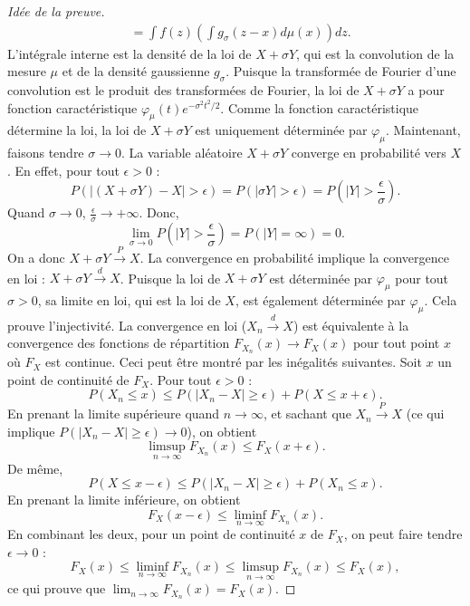 \begin{proof}[Idée de la preuve]
\begin{align*}
&= \int f(z) \left( \int g_\sigma(z-x) d\mu(x) \right) dz.
\end{align*}
L'intégrale interne est la densité de la loi de $X+\sigma Y$, qui est la convolution de la mesure $\mu$ et de la densité gaussienne $g_\sigma$. Puisque la transformée de Fourier d'une convolution est le produit des transformées de Fourier, la loi de $X+\sigma Y$ a pour fonction caractéristique $\varphi_\mu(t) e^{-\sigma^2 t^2/2}$.
Comme la fonction caractéristique détermine la loi, la loi de $X+\sigma Y$ est uniquement déterminée par $\varphi_\mu$.
Maintenant, faisons tendre $\sigma \to 0$. La variable aléatoire $X+\sigma Y$ converge en probabilité vers $X$.
En effet, pour tout $\epsilon > 0$ :
\[ P(|(X+\sigma Y) - X| > \epsilon) = P(|\sigma Y| > \epsilon) = P\left(|Y| > \frac{\epsilon}{\sigma}\right). \]
Quand $\sigma \to 0$, $\frac{\epsilon}{\sigma} \to +\infty$. Donc,
\[ \lim_{\sigma \to 0} P\left(|Y| > \frac{\epsilon}{\sigma}\right) = P(|Y| = \infty) = 0. \]
On a donc $X+\sigma Y \xrightarrow{P} X$.
La convergence en probabilité implique la convergence en loi : $X+\sigma Y \xrightarrow{d} X$.
Puisque la loi de $X+\sigma Y$ est déterminée par $\varphi_\mu$ pour tout $\sigma>0$, sa limite en loi, qui est la loi de $X$, est également déterminée par $\varphi_\mu$. Cela prouve l'injectivité.
La convergence en loi ($X_n \xrightarrow{d} X$) est équivalente à la convergence des fonctions de répartition $F_{X_n}(x) \to F_X(x)$ pour tout point $x$ où $F_X$ est continue. Ceci peut être montré par les inégalités suivantes.
Soit $x$ un point de continuité de $F_X$. Pour tout $\epsilon > 0$ :
\[ P(X_n \le x) \le P(|X_n - X| \ge \epsilon) + P(X \le x+\epsilon). \]
En prenant la limite supérieure quand $n \to \infty$, et sachant que $X_n \xrightarrow{P} X$ (ce qui implique $P(|X_n - X| \ge \epsilon) \to 0$), on obtient
\[ \limsup_{n\to\infty} F_{X_n}(x) \le F_X(x+\epsilon). \]
De même,
\[ P(X \le x-\epsilon) \le P(|X_n - X| \ge \epsilon) + P(X_n \le x). \]
En prenant la limite inférieure, on obtient
\[ F_X(x-\epsilon) \le \liminf_{n\to\infty} F_{X_n}(x). \]
En combinant les deux, pour un point de continuité $x$ de $F_X$, on peut faire tendre $\epsilon \to 0$ :
\[ F_X(x) \le \liminf_{n\to\infty} F_{X_n}(x) \le \limsup_{n\to\infty} F_{X_n}(x) \le F_X(x), \]
ce qui prouve que $\lim_{n\to\infty} F_{X_n}(x) = F_X(x)$.
\end{proof}